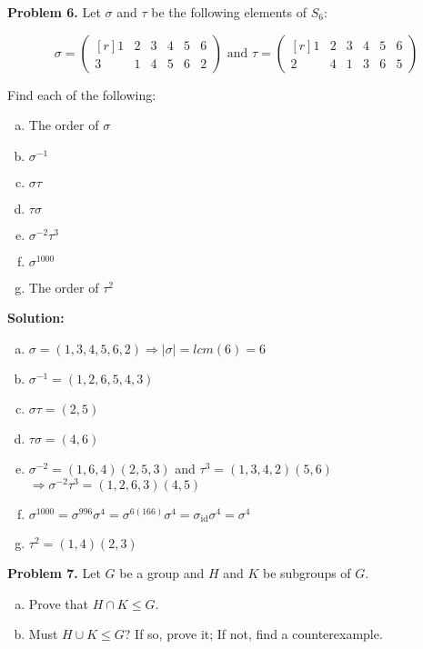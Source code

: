 \documentclass[12pt, letterpaper]{article}
\newenvironment{problem}
    [1]
    {\noindent \textbf{Problem #1.}}
    {\vspace{3mm}}
\newenvironment{solution}
    [0]
    {\noindent \textbf{Solution:}} 
    {\vspace{3mm}}
\begin{document}
\begin{problem}{6}
    Let $\sigma$ and $\tau$ be the following elements of $S_6$:

    $$
    \sigma = \begin{pmatrix*}[r] 1 & 2 & 3 & 4 & 5 & 6 \\ 3 & 1 & 4 & 5 & 6 & 2 \end{pmatrix*} \text{ and }
    \tau = \begin{pmatrix*}[r] 1 & 2 & 3 & 4 & 5 & 6 \\ 2 & 4 & 1 & 3 & 6 & 5 \end{pmatrix*}
    $$

    \noindent
    Find each of the following:

    \begin{enumerate}[(a)]
        \item The order of $\sigma$
        \item $\sigma^{-1}$
        \item $\sigma\tau$
        \item $\tau\sigma$
        \item $\sigma^{-2}\tau^3$
        \item $\sigma^{1000}$
        \item The order of $\tau^{2}$
    \end{enumerate}
\end{problem}

\begin{solution}
    \begin{enumerate}[(a)]
        \item $\sigma = (1, 3, 4, 5, 6, 2) \Rightarrow |\sigma| = lcm(6) = 6$
        \item $\sigma^{-1} = (1, 2, 6, 5, 4, 3)$
        \item $\sigma\tau = (2, 5)$
        \item $\tau\sigma = (4, 6)$
        \item $\sigma^{-2} = (1, 6, 4)(2, 5, 3)$ and $\tau^3 = (1, 3, 4, 2)(5, 6)$
        $\Rightarrow \sigma^{-2}\tau^3 = (1, 2, 6, 3)(4, 5)$
        \item $\sigma^{1000} = \sigma^{996}\sigma^4 = \sigma^{6(166)}\sigma^4 = \sigma_{\text{id}}\sigma^4 = \sigma^4$
        \item $\tau^2 = (1, 4)(2, 3)$
    \end{enumerate}
\end{solution}

\begin{problem}{7}
    Let $G$ be a group and $H$ and $K$ be subgroups of $G$.
    \begin{enumerate}[(a)]
        \item Prove that $H \cap K \le G$.
        \item Must $H \cup K \le G$? If so, prove it; If not,
        find a counterexample.
    \end{enumerate}
\end{problem}
\end{document}

